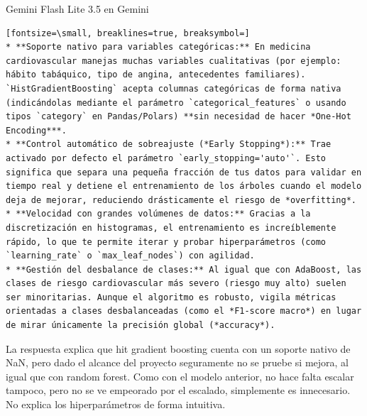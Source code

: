 \documentclass[12pt,a4paper,oneside]{book}
\begin{document}
\begin{iaresp}{Gemini Flash Lite 3.5 en Gemini}
\begin{Verbatim}[fontsize=\small, breaklines=true, breaksymbol=]
* **Soporte nativo para variables categóricas:** En medicina cardiovascular manejas muchas variables cualitativas (por ejemplo: hábito tabáquico, tipo de angina, antecedentes familiares). `HistGradientBoosting` acepta columnas categóricas de forma nativa (indicándolas mediante el parámetro `categorical_features` o usando tipos `category` en Pandas/Polars) **sin necesidad de hacer *One-Hot Encoding***.
* **Control automático de sobreajuste (*Early Stopping*):** Trae activado por defecto el parámetro `early_stopping='auto'`. Esto significa que separa una pequeña fracción de tus datos para validar en tiempo real y detiene el entrenamiento de los árboles cuando el modelo deja de mejorar, reduciendo drásticamente el riesgo de *overfitting*.
* **Velocidad con grandes volúmenes de datos:** Gracias a la discretización en histogramas, el entrenamiento es increíblemente rápido, lo que te permite iterar y probar hiperparámetros (como `learning_rate` o `max_leaf_nodes`) con agilidad.
* **Gestión del desbalance de clases:** Al igual que con AdaBoost, las clases de riesgo cardiovascular más severo (riesgo muy alto) suelen ser minoritarias. Aunque el algoritmo es robusto, vigila métricas orientadas a clases desbalanceadas (como el *F1-score macro*) en lugar de mirar únicamente la precisión global (*accuracy*).
\end{Verbatim}
\end{iaresp}
\begin{iaanalisis}
La respuesta explica que hit gradient boosting cuenta con un soporte nativo de NaN, pero dado el alcance del proyecto seguramente no se pruebe si mejora, al igual que con random forest. Como con el modelo anterior, no hace falta escalar tampoco, pero no se ve empeorado por el escalado, simplemente es innecesario. No explica los hiperparámetros de forma intuitiva.
\end{iaanalisis}
\end{document}
